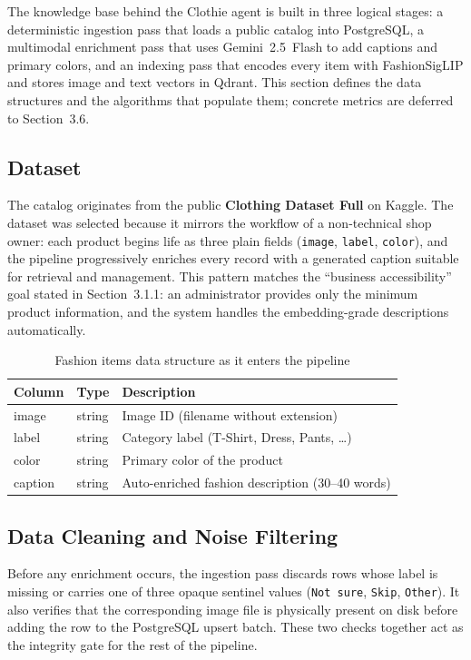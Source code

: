 The knowledge base behind the Clothie agent is built in three logical stages: a deterministic ingestion pass that loads a public catalog into PostgreSQL, a multimodal enrichment pass that uses Gemini~2.5~Flash to add captions and primary colors, and an indexing pass that encodes every item with FashionSigLIP and stores image and text vectors in Qdrant. This section defines the data structures and the algorithms that populate them; concrete metrics are deferred to Section~3.6.

\subsection{Dataset}

The catalog originates from the public \textbf{Clothing Dataset Full} on Kaggle. The dataset was selected because it mirrors the workflow of a non-technical shop owner: each product begins life as three plain fields (\texttt{image}, \texttt{label}, \texttt{color}), and the pipeline progressively enriches every record with a generated caption suitable for retrieval and management. This pattern matches the ``business accessibility'' goal stated in Section~3.1.1: an administrator provides only the minimum product information, and the system handles the embedding-grade descriptions automatically.

\begin{table}[H]
\centering
\begin{tabular}{lll}
\toprule
\textbf{Column} & \textbf{Type} & \textbf{Description}\\
\midrule
image   & string & Image ID (filename without extension)\\
label   & string & Category label (T-Shirt, Dress, Pants, \ldots)\\
color   & string & Primary color of the product\\
caption & string & Auto-enriched fashion description (30--40 words)\\
\bottomrule
\end{tabular}
\caption{Fashion items data structure as it enters the pipeline}
\label{tab:dataset_structure}
\end{table}

\subsection{Data Cleaning and Noise Filtering}

Before any enrichment occurs, the ingestion pass discards rows whose label is missing or carries one of three opaque sentinel values (\texttt{Not sure}, \texttt{Skip}, \texttt{Other}). It also verifies that the corresponding image file is physically present on disk before adding the row to the PostgreSQL upsert batch. These two checks together act as the integrity gate for the rest of the pipeline.

